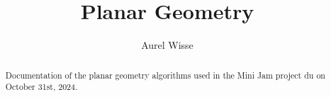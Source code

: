 \documentclass[11pt]{article}
\begin{document}
%
%
\title{Planar Geometry}
\author{Aurel Wisse}
\maketitle
%
%
\begin{abstract}
Documentation of the planar geometry algorithms used in the
Mini Jam project du on October 31st, 2024.
\end{abstract}

%
%
\end{document}

